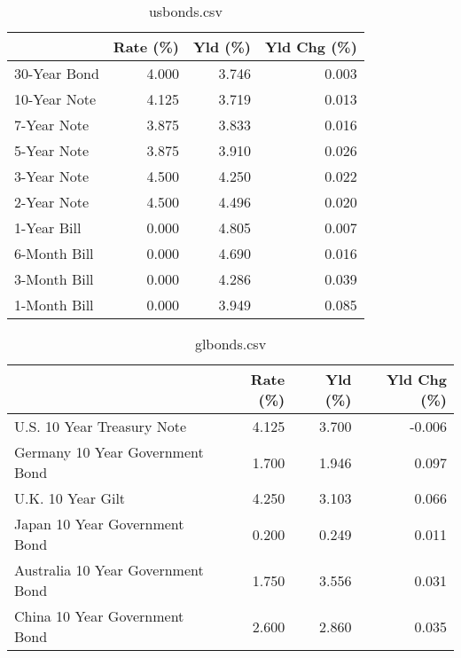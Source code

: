 \documentclass{article}%
\begin{document}
%


\begin{table}[htbp]%
\caption{usbonds.csv}%
\centering%
\begin{adjustbox}{width=1\textwidth}%
\begin{tabular}{lrrr}
\toprule
             &  Rate (\%) &  Yld (\%) &  Yld Chg (\%) \\
\midrule
30-Year Bond &     4.000 &    3.746 &        0.003 \\
10-Year Note &     4.125 &    3.719 &        0.013 \\
 7-Year Note &     3.875 &    3.833 &        0.016 \\
 5-Year Note &     3.875 &    3.910 &        0.026 \\
 3-Year Note &     4.500 &    4.250 &        0.022 \\
 2-Year Note &     4.500 &    4.496 &        0.020 \\
 1-Year Bill &     0.000 &    4.805 &        0.007 \\
6-Month Bill &     0.000 &    4.690 &        0.016 \\
3-Month Bill &     0.000 &    4.286 &        0.039 \\
1-Month Bill &     0.000 &    3.949 &        0.085 \\
\bottomrule
\end{tabular}
%
\end{adjustbox}%
\end{table}

%


\begin{table}[htbp]%
\caption{glbonds.csv}%
\centering%
\begin{adjustbox}{width=1\textwidth}%
\begin{tabular}{lrrr}
\toprule
                                  &  Rate (\%) &  Yld (\%) &  Yld Chg (\%) \\
\midrule
       U.S. 10 Year Treasury Note &     4.125 &    3.700 &       -0.006 \\
  Germany 10 Year Government Bond &     1.700 &    1.946 &        0.097 \\
                U.K. 10 Year Gilt &     4.250 &    3.103 &        0.066 \\
    Japan 10 Year Government Bond &     0.200 &    0.249 &        0.011 \\
Australia 10 Year Government Bond &     1.750 &    3.556 &        0.031 \\
    China 10 Year Government Bond &     2.600 &    2.860 &        0.035 \\
\bottomrule
\end{tabular}
%
\end{adjustbox}%
\end{table}
\end{document}
